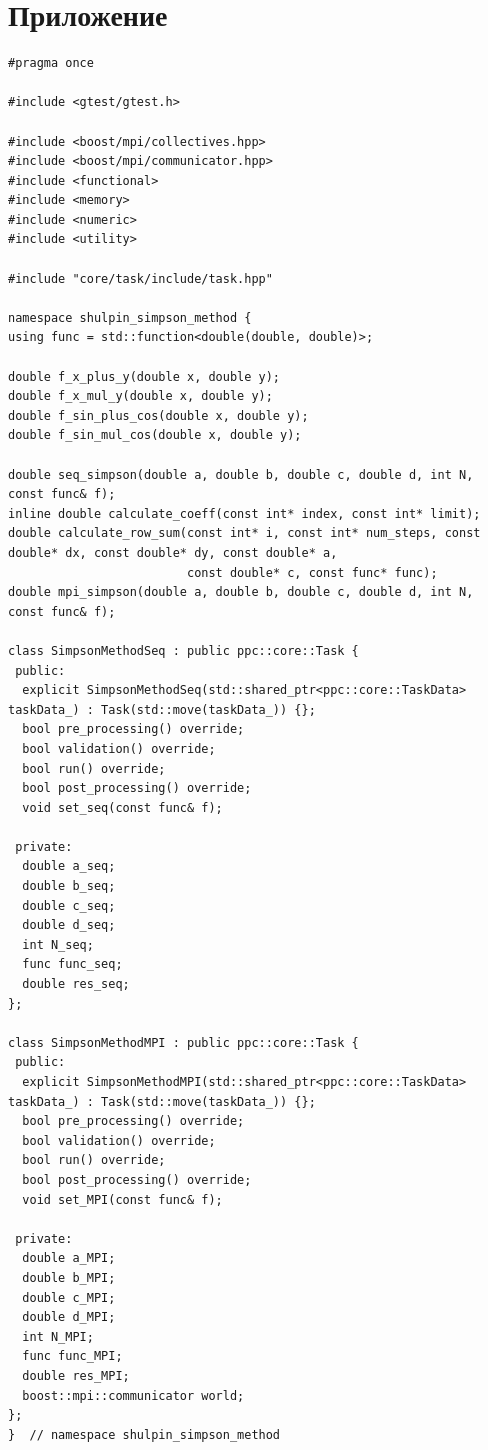 \documentclass[12pt,a4paper]{article}
\begin{document}
\section*{Приложение}
\begin{lstlisting}[caption={simpson\_method.hpp}]
#pragma once

#include <gtest/gtest.h>

#include <boost/mpi/collectives.hpp>
#include <boost/mpi/communicator.hpp>
#include <functional>
#include <memory>
#include <numeric>
#include <utility>

#include "core/task/include/task.hpp"

namespace shulpin_simpson_method {
using func = std::function<double(double, double)>;

double f_x_plus_y(double x, double y);
double f_x_mul_y(double x, double y);
double f_sin_plus_cos(double x, double y);
double f_sin_mul_cos(double x, double y);

double seq_simpson(double a, double b, double c, double d, int N, const func& f);
inline double calculate_coeff(const int* index, const int* limit);
double calculate_row_sum(const int* i, const int* num_steps, const double* dx, const double* dy, const double* a,
                         const double* c, const func* func);
double mpi_simpson(double a, double b, double c, double d, int N, const func& f);

class SimpsonMethodSeq : public ppc::core::Task {
 public:
  explicit SimpsonMethodSeq(std::shared_ptr<ppc::core::TaskData> taskData_) : Task(std::move(taskData_)) {};
  bool pre_processing() override;
  bool validation() override;
  bool run() override;
  bool post_processing() override;
  void set_seq(const func& f);

 private:
  double a_seq;
  double b_seq;
  double c_seq;
  double d_seq;
  int N_seq;
  func func_seq;
  double res_seq;
};

class SimpsonMethodMPI : public ppc::core::Task {
 public:
  explicit SimpsonMethodMPI(std::shared_ptr<ppc::core::TaskData> taskData_) : Task(std::move(taskData_)) {};
  bool pre_processing() override;
  bool validation() override;
  bool run() override;
  bool post_processing() override;
  void set_MPI(const func& f);

 private:
  double a_MPI;
  double b_MPI;
  double c_MPI;
  double d_MPI;
  int N_MPI;
  func func_MPI;
  double res_MPI;
  boost::mpi::communicator world;
};
}  // namespace shulpin_simpson_method
\end{lstlisting}
\end{document}
